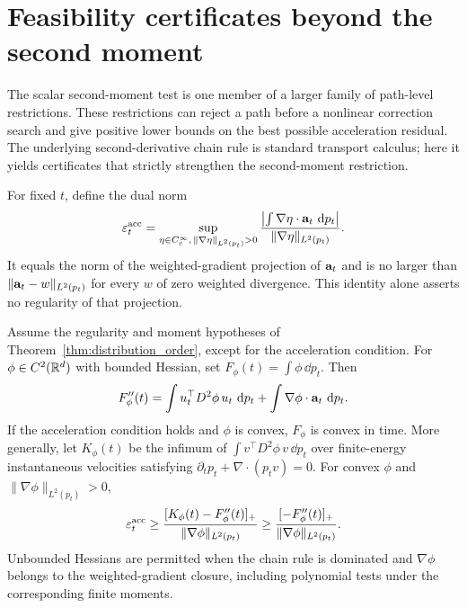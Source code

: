 \section{Feasibility certificates beyond the second moment}
\label{sec:convex-feasibility}

The scalar second-moment test is one member of a larger family of
path-level restrictions.  These restrictions can reject a path before a
nonlinear correction search and give positive lower bounds on the best
possible acceleration residual.  The underlying second-derivative chain
rule is standard transport calculus; here it yields certificates that
strictly strengthen the second-moment restriction.

For fixed $t$, define the dual norm
\begin{equation}
 \varepsilon_t^{\rm acc}
 =\sup_{\eta\in C_c^\infty,\,\|\nabla\eta\|_{L^2(p_t)}>0}
 \frac{\left|\int \nabla\eta\cdot\mathbf a_t\,\,\mathrm d p_t\right|}
 {\|\nabla\eta\|_{L^2(p_t)}}.
 \label{eq:acc-dual-norm}
\end{equation}
It equals the norm of the weighted-gradient projection of $\mathbf a_t$ and is
no larger than $\|\mathbf a_t-w\|_{L^2(p_t)}$ for every $w$ of zero weighted
divergence.  This identity alone asserts no regularity of that projection.

\begin{theorem}
\label{thm:convex-feasibility}
Assume the regularity and moment hypotheses of
Theorem~\ref{thm:distribution_order}, except for the acceleration condition.
For $\phi\in C^2(\mathbb R^d)$ with bounded Hessian, set
$F_\phi(t)=\int\phi\,\dd p_t$.  Then
\begin{equation}
 F_\phi''(t)=\int u_t^\top D^2\phi\,u_t\,\,\mathrm d p_t
       +\int\nabla\phi\cdot\mathbf a_t\,\,\mathrm d p_t.
 \label{eq:convex-chain-rule}
\end{equation}
If the acceleration condition holds and $\phi$ is convex, $F_\phi$ is
convex in time.  More generally, let $K_\phi(t)$ be the infimum of
$\int v^\top D^2\phi\,v\,\dd p_t$ over finite-energy instantaneous velocities
satisfying $\partial_t p_t+\nabla\cdot(p_tv)=0$.  For convex $\phi$ and
$\|\nabla\phi\|_{L^2(p_t)}>0$,
\begin{equation}
 \varepsilon_t^{\rm acc}\ge
 \frac{[K_\phi(t)-F_\phi''(t)]_+}
 {\|\nabla\phi\|_{L^2(p_t)}}
 \ge\frac{[-F_\phi''(t)]_+}{\|\nabla\phi\|_{L^2(p_t)}}.
 \label{eq:convex-residual-floor}
\end{equation}
Unbounded Hessians are permitted when the chain rule is dominated and
$\nabla\phi$ belongs to the weighted-gradient closure, including
polynomial tests under the corresponding finite moments.
\end{theorem}

